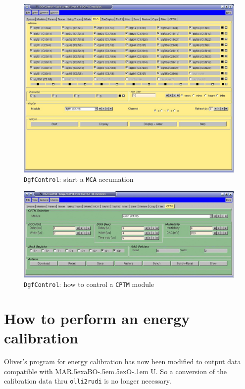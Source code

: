 \documentclass[10pt]{article}
\def\MARaBOU{MAR\lower.5ex\hbox{a}BO\kern-.5em\lower.5ex\hbox{O}\kern-.1em U}%
\begin{document}
\begin{figure}[H]
\centerline{\includegraphics[width=\linewidth]{DgfControlMcaTab}}
\caption{\texttt{DgfControl}: start a \texttt{MCA} accumation}
\label{DgfControlMcaTab}
\end{figure}
\begin{figure}[H]
\centerline{\includegraphics[width=\linewidth]{DGFCptmPanel}}
\caption{\texttt{DgfControl}: how to control a \texttt{CPTM} module}
\label{DgfControlCptmTab}
\end{figure}
\newpage
\section{How to perform an energy calibration}\vspace{3mm}

Oliver's program for energy calibration has now been modified to output data compatible with \MARaBOU{}. So a conversion of the
calibration data thru \texttt{olli2rudi} is no longer necessary.\\
\end{document}
